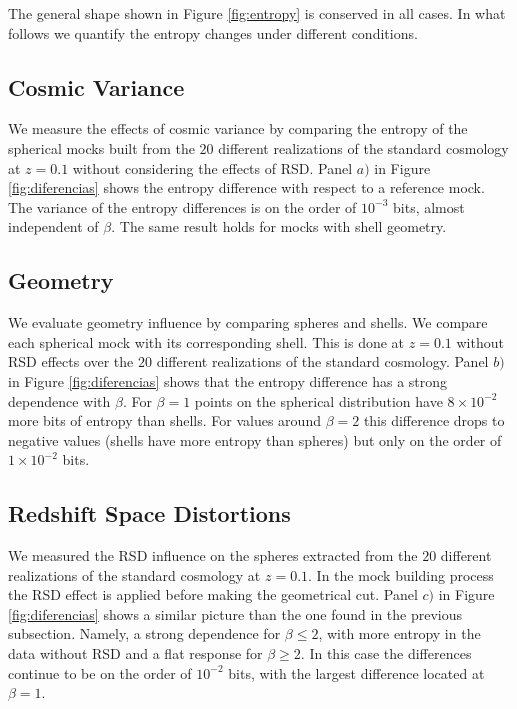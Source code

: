 \documentclass[fleqn,usenatbib]{mnras}
\begin{document}
The general shape shown in Figure \ref{fig:entropy} is conserved in
all cases.  
In what follows we quantify the entropy changes under different
conditions.

\subsection{Cosmic Variance}

We measure the effects of cosmic variance by comparing the entropy of the spherical 
mocks built from the $20$ different realizations of the standard
cosmology at $z=0.1$ without considering the effects of RSD.  
Panel $a)$ in Figure \ref{fig:diferencias} shows the entropy
difference with respect to a reference mock. The variance of the
entropy differences is on the order of $10^{-3}$ bits, almost
independent of $\beta$. 
The same result holds for mocks with shell geometry.



\subsection{Geometry}

We evaluate geometry influence by comparing spheres and shells.
We compare each spherical mock with its corresponding shell.
This is done at $z=0.1$ without RSD effects over the $20$ different realizations
of the standard cosmology.
Panel $b)$ in Figure \ref{fig:diferencias} shows that the entropy
difference has a strong dependence with $\beta$.  
For $\beta=1$ points on the spherical distribution have $8\times
10^{-2}$ more bits of entropy than shells. 
For values around $\beta=2$ this difference drops to negative values
(shells have more entropy than spheres) but only on the order of
$1\times10^{-2}$ bits. 




\subsection{Redshift Space Distortions}

We measured the RSD influence on the spheres extracted from the $20$ different realizations of the standard cosmology at $z=0.1$.
In the mock building process the RSD effect is applied before making the geometrical cut.
Panel $c)$ in Figure \ref{fig:diferencias} shows a similar picture than the one found in the previous subsection.
Namely, a strong dependence for $\beta\leq 2$, with more entropy in the data without RSD and a flat response for $\beta\geq 2$.
In this case the differences continue to be on the order of $10^{-2}$ bits, with the
largest difference located at $\beta=1$.
\end{document}

